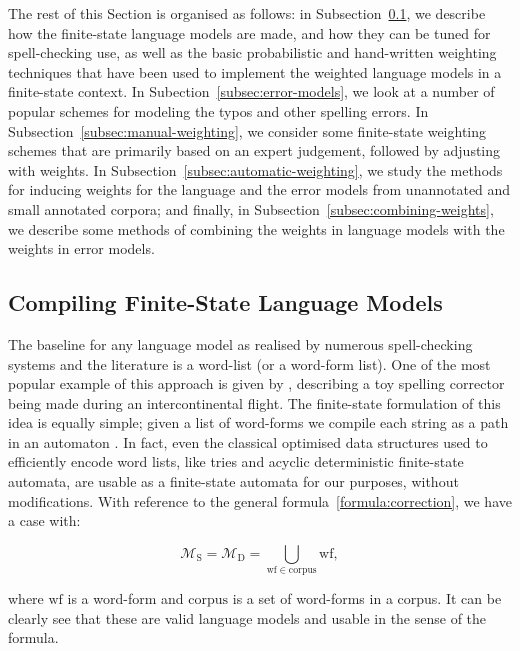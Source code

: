 \documentclass[a4paper,12pt]{article}
\begin{document}
The rest of this Section is organised as follows: in
Subsection~\ref{subsec:language-models}, we describe how the finite-state
language models are made, and how they can be tuned for spell-checking use, as
well as the basic probabilistic and hand-written weighting techniques that have
been used to implement the weighted language models in a finite-state context.  In
Subection~\ref{subsec:error-models}, we look at a number of popular schemes for
modeling the typos and other spelling errors.  In
Subsection~\ref{subsec:manual-weighting}, we consider some finite-state weighting
schemes that are primarily based on an expert judgement, followed by adjusting
with weights.  In Subsection~\ref{subsec:automatic-weighting}, we study the
methods for inducing weights for the language and the error models from
unannotated and small annotated corpora; and finally, in
Subsection~\ref{subsec:combining-weights}, we describe some methods of combining
the weights in language models with the weights in error models.

\subsection{Compiling Finite-State Language Models}
\label{subsec:language-models}

The baseline for any language model as realised by numerous spell-checking
systems and the literature is a word-list (or a word-form list). One of the
most popular example of this approach is given by \cite{norvig/2010},
describing a toy spelling corrector being made during an intercontinental
flight. The finite-state formulation of this idea is equally simple; given a
list of word-forms we compile each string as a path in an automaton
\cite[]{pirinen2012effects}. In fact, even the classical optimised data
structures used to efficiently encode word lists, like tries and acyclic
deterministic finite-state automata, are usable as a finite-state automata for
our purposes, without modifications. With reference to the general
formula~\ref{formula:correction}, we have a case with:

\begin{equation}
    \mathcal{M}_\mathrm{S} = \mathcal{M}_\mathrm{D} = \bigcup_{\mathrm{wf} \in \mathrm{corpus}} \mathrm{wf},
\end{equation}

where $\mathrm{wf}$ is a word-form and $\mathrm{corpus}$ is a set of word-forms
in a corpus. It can be clearly see that these are valid language models and
usable in the sense of the formula.
\end{document}
